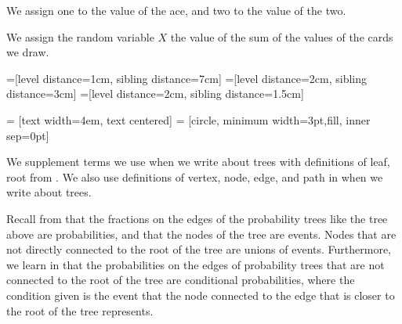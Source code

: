 \documentclass[a4paper,11pt]{article}
\begin{document}
We assign one to the value of the ace, and two to the value of the two.

We assign the random variable $X$ the value of the sum of the values
of the cards we draw.

=[level distance=1cm, sibling distance=7cm]
=[level distance=2cm, sibling distance=3cm]
=[level distance=2cm, sibling distance=1.5cm]

 = [text width=4em, text centered]
 = [circle, minimum width=3pt,fill, inner sep=0pt]

\begin{center}
\end{center}

We supplement terms we use when we write about trees with definitions 
of leaf, root from \cite{treeSlides}.  We also use definitions of 
vertex, node, edge, and path in \cite{graphSlides} when we write about
trees.

Recall from \cite{reading3} that the fractions on the edges of the
probability trees like the tree above are probabilities, and that the
nodes of the tree are events.  Nodes that are not directly connected to 
the root of the tree are unions of events.  Furthermore,  we learn in 
\cite{reading3} that the probabilities on the edges of probability trees 
that are not connected to the root of the tree are conditional 
probabilities, where the condition given is  the event that the node 
connected to the edge that is closer to the root of the tree represents. 
\end{document}
